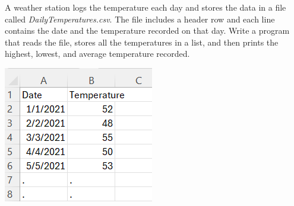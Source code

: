	\item 
		A weather station logs the temperature each day and stores the data in a file called 
		\textit{DailyTemperatures.csv}. The file includes a header row and each line contains the date 
		and the temperature recorded on that day. Write a program that reads the file, stores all the 
		temperatures in a list, and then prints the highest, lowest, and average temperature recorded.
		
		\begin{flushright}
			\includegraphics[scale=.65]{imgs/DailyTemperaturesData.PNG}
		\end{flushright}



